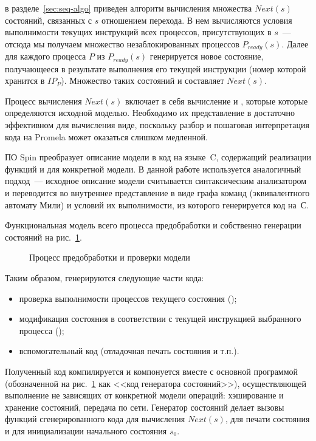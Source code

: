 в разделе~\ref{sec:seq-algo} приведен алгоритм вычисления множества $Next(s)$ состояний, связанных
с $s$ отношением перехода. В нем вычисляются условия выполнимости текущих инструкций всех
процессов, присутствующих в $s$~--- отсюда мы получаем множество незаблокированных
процессов $P_{ready}(s)$. Далее для каждого процесса $P$ из $P_{ready}(s)$ генерируется
новое состояние, получающееся в результате выполнения его текущей инструкции (номер
которой хранится в $IP_P$). Множество таких состояний и составляет $Next(s)$.

Процесс вычисления $Next(s)$ включает в себя вычисление  и ,
которые которые определяются исходной моделью. Необходимо их представление в достаточно
эффективном для вычисления виде, поскольку разбор и пошаговая интерпретация кода на
Promela может оказаться слишком медленной.

ПО Spin преобразует описание модели в код на языке~C, содержащий реализации функций
 и  для конкретной модели. В данной работе используется
аналогичный подход~--- исходное описание модели считывается синтаксическим анализатором и
переводится во внутреннее представление в виде графа команд (эквивалентного автомату Мили)
и условий их выполнимости, из которого генерируется код на~С.

Функциональная модель всего процесса предобработки и собственно генерации состояний на
рис.~\ref{fig:idef0-codegen}.

\begin{figure}[ht]
  \centering
  \caption{Процесс предобработки и проверки модели}
\label{fig:idef0-codegen}
\end{figure}

Таким образом, генерируются следующие части кода:

\begin{itemize}
\item проверка выполнимости процессов текущего состояния ();
\item модификация состояния в соответствии с текущей инструкцией выбранного процесса (); 
\item вспомогательный код (отладочная печать состояния и т.п.).
\end{itemize}

Полученный код компилируется и компонуется вместе с основной программой (обозначенной на
рис.~\ref{fig:idef0-codegen} как <<код генератора состояний>>), осуществляющей выполнение
не зависящих от конкретной модели операций: хэширование и хранение состояний, передача по
сети\etc. Генератор состояний делает вызовы функций сгенерированного кода для вычисления
$Next(s)$, для печати состояния и для инициализации начального состояния $s_0$.

